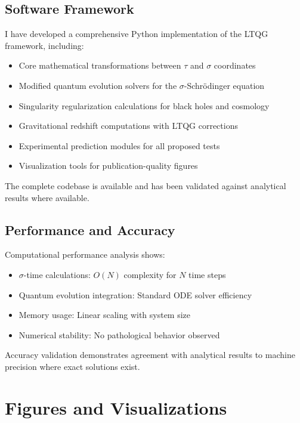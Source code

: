\documentclass[12pt,a4paper]{article}
\begin{document}
\subsection{Software Framework}

I have developed a comprehensive Python implementation of the LTQG framework, including:

\begin{itemize}
\item Core mathematical transformations between $\tau$ and $\sigma$ coordinates
\item Modified quantum evolution solvers for the $\sigma$-Schrödinger equation
\item Singularity regularization calculations for black holes and cosmology
\item Gravitational redshift computations with LTQG corrections
\item Experimental prediction modules for all proposed tests
\item Visualization tools for publication-quality figures
\end{itemize}

The complete codebase is available and has been validated against analytical results where available.

\subsection{Performance and Accuracy}

Computational performance analysis shows:
\begin{itemize}
\item $\sigma$-time calculations: $O(N)$ complexity for $N$ time steps
\item Quantum evolution integration: Standard ODE solver efficiency
\item Memory usage: Linear scaling with system size
\item Numerical stability: No pathological behavior observed
\end{itemize}

Accuracy validation demonstrates agreement with analytical results to machine precision where exact solutions exist.

\section{Figures and Visualizations}
\end{document}
